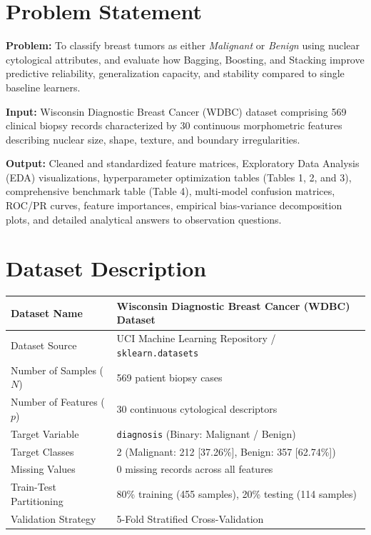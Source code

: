 \documentclass[12pt,a4paper]{article}
\begin{document}
\section{Problem Statement}
\textbf{Problem:} To classify breast tumors as either \textit{Malignant} or \textit{Benign} using nuclear cytological attributes, and evaluate how Bagging, Boosting, and Stacking improve predictive reliability, generalization capacity, and stability compared to single baseline learners.

\textbf{Input:} Wisconsin Diagnostic Breast Cancer (WDBC) dataset comprising 569 clinical biopsy records characterized by 30 continuous morphometric features describing nuclear size, shape, texture, and boundary irregularities.

\textbf{Output:} Cleaned and standardized feature matrices, Exploratory Data Analysis (EDA) visualizations, hyperparameter optimization tables (Tables 1, 2, and 3), comprehensive benchmark table (Table 4), multi-model confusion matrices, ROC/PR curves, feature importances, empirical bias-variance decomposition plots, and detailed analytical answers to observation questions.

\section{Dataset Description}
\begin{longtable}{|p{6cm}|p{8cm}|}
\hline
Dataset Name & Wisconsin Diagnostic Breast Cancer (WDBC) Dataset\\ \hline
Dataset Source & UCI Machine Learning Repository / \texttt{sklearn.datasets}\\ \hline
Number of Samples ($N$) & 569 patient biopsy cases\\ \hline
Number of Features ($p$) & 30 continuous cytological descriptors\\ \hline
Target Variable & \texttt{diagnosis} (Binary: Malignant / Benign)\\ \hline
Target Classes & 2 (Malignant: 212 [37.26\%], Benign: 357 [62.74\%])\\ \hline
Missing Values & 0 missing records across all features\\ \hline
Train-Test Partitioning & 80\% training (455 samples), 20\% testing (114 samples)\\ \hline
Validation Strategy & 5-Fold Stratified Cross-Validation\\ \hline
\end{longtable}
\end{document}
